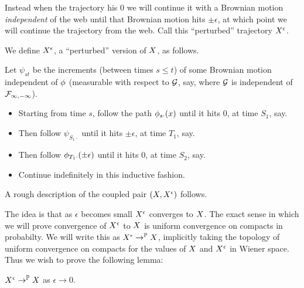 {Instead when the trajectory his $0$ we will continue it with a
Brownian motion \emph{independent} of the web until that Brownian
motion hits $\pm\epsilon$, at which point we will continue the
trajectory from the web.  Call this ``perturbed'' trajectory
$X^{\epsilon}$.

{
\newcommand{\joinernoargs}{\psi}
\newcommand{\joiner}[2]{\joinernoargs_{{#1}{#2}}}
\begin{definition}
  We define $X^{\epsilon}$, a ``perturbed'' version of $X$, as
  follows.

  Let $\joiner{s}{t}$ be the increments (between times $s \le t$) of
  some Brownian motion independent of $\phi$ (measurable with
  respect to $\mathcal{G}$, say, where $\mathcal{G}$ is independent of
  $\mathcal{F}_{\infty,-\infty}$).

  \begin{itemize}
  \item Starting from time $s$, follow the path $\phi_{{s}{\cdot}}(x)$
    until it hits $0$, at time $S_1$, say.
  \item Then follow $\joiner{S_1}{\cdot}$ until it hits $\pm \epsilon$, at
    time $T_1$, say.
  \item Then follow $\phi_{{T_1}{\cdot}}(\pm \epsilon)$ until it hits $0$, at
    time $S_2$, say.
  \item Continue indefinitely in this inductive fashion.
  \end{itemize}
\end{definition}
}

\begin{obs}
  \label{obs:2d-proc}
  A rough description of the coupled pair $(X, X^{\epsilon})$
  follows.

\end{obs}

The idea is that as $\epsilon$ becomes small $X^{\epsilon}$
converges to $X$.
The exact sense in which we will prove convergence of $X^{\epsilon}$ to
$X$ is uniform convergence on compacts in probabilty.  We will
write this as $X^{\epsilon} \to^{\mathbb{P}} X$, implicitly taking the
topology of uniform convergence on compacts for the values of $X$
and $X^{\epsilon}$ in Wiener space.  Thus we wish to prove the following
lemma:

\begin{lemma}
  \label{lem:resamplede-to-sampled}
  $X^{\epsilon} \to^{\mathbb{P}} X$ as $\epsilon \to 0$.
\end{lemma}

}
